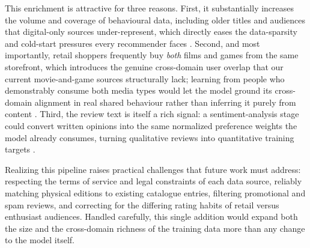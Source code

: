 This enrichment is attractive for three reasons. First, it substantially increases the volume and coverage of behavioural data, including older titles and audiences that digital-only sources under-represent, which directly eases the data-sparsity and cold-start pressures every recommender faces \cite{ref:cold_start}. Second, and most importantly, retail shoppers frequently buy \emph{both} films and games from the same storefront, which introduces the genuine cross-domain user overlap that our current movie-and-game sources structurally lack; learning from people who demonstrably consume both media types would let the model ground its cross-domain alignment in real shared behaviour rather than inferring it purely from content \cite{ref:cross_domain_survey}. Third, the review text is itself a rich signal: a sentiment-analysis stage could convert written opinions into the same normalized preference weights the model already consumes, turning qualitative reviews into quantitative training targets \cite{taha2024}.

Realizing this pipeline raises practical challenges that future work must address: respecting the terms of service and legal constraints of each data source, reliably matching physical editions to existing catalogue entries, filtering promotional and spam reviews, and correcting for the differing rating habits of retail versus enthusiast audiences. Handled carefully, this single addition would expand both the size and the cross-domain richness of the training data more than any change to the model itself.

